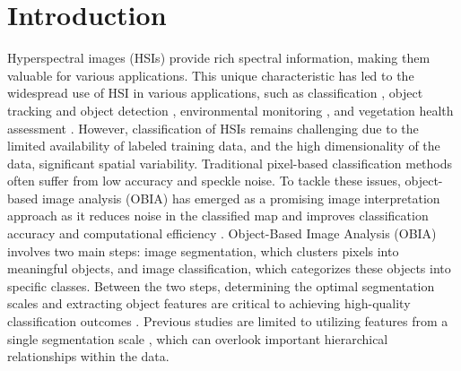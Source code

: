 \section{Introduction} \label{sec:introduction}

Hyperspectral images (HSIs) provide rich spectral information, making them valuable for various applications. \citep{lu2020} This unique characteristic has led to the widespread use of HSI in various applications, such as classification \citep{melgani2004, fang2015, fang2018, DAO2021102542}, object tracking \citep{wang2010, uzkent2016, uzkent2017} and object detection \citep{pan2003, liu2016, zhang2016}, environmental monitoring \citep{ellis2004, manfreda2018}, and vegetation health assessment \citep{DAO2021102364}. However, classification of HSIs remains challenging due to the limited availability of labeled training data, and the high dimensionality of the data, significant spatial variability. Traditional pixel-based classification methods often suffer from low accuracy and speckle noise. To tackle these issues, object-based image analysis (OBIA) has emerged as a promising image interpretation approach as it reduces noise in the classified map and improves classification accuracy and computational efficiency \citep{20-photo-j, blaschke2010object}. Object-Based Image Analysis (OBIA) involves two main steps: image segmentation, which clusters pixels into meaningful objects, and image classification, which categorizes these objects into specific classes. Between the two steps, determining the optimal segmentation scales and extracting object features are critical to achieving high-quality classification outcomes \citep{20-photo-j, draguct2010esp}. Previous studies are limited to utilizing features from a single segmentation scale \citep{20-photo-j}, which can overlook important hierarchical relationships within the data.
 




